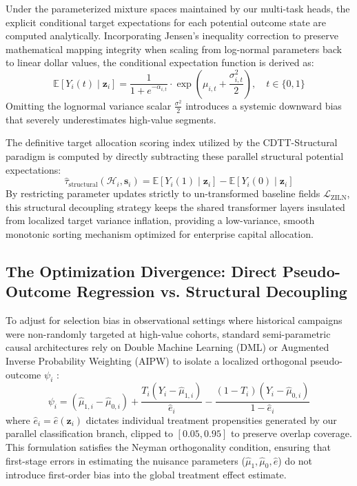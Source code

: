\documentclass[10pt, conference]{IEEEtran}
\newcommand{\ourmodel}{CDTT}
\begin{document}
Under the parameterized mixture spaces maintained by our multi-task heads, the explicit conditional target expectations for each potential outcome state are computed analytically. Incorporating Jensen's inequality correction to preserve mathematical mapping integrity when scaling from log-normal parameters back to linear dollar values, the conditional expectation function is derived as:
\begin{equation}
\mathbb{E}[Y_i(t) \mid \mathbf{z}_i] = \frac{1}{1 + e^{-\alpha_{i,t}}} \cdot \exp\left( \mu_{i,t} + \frac{\sigma_{i,t}^2}{2} \right), \quad t \in \{0, 1\}
\end{equation}
Omitting the lognormal variance scalar $\frac{\sigma^2}{2}$ introduces a systemic downward bias that severely underestimates high-value segments. 

The definitive target allocation scoring index utilized by the \ourmodel-Structural paradigm is computed by directly subtracting these parallel structural potential expectations:
\begin{equation}
\hat{\tau}_{\text{structural}}(\mathcal{H}_i, \mathbf{s}_i) = \mathbb{E}[Y_i(1) \mid \mathbf{z}_i] - \mathbb{E}[Y_i(0) \mid \mathbf{z}_i]
\end{equation}
By restricting parameter updates strictly to un-transformed baseline fields $\mathcal{L}_{\text{ZILN}}$, this structural decoupling strategy keeps the shared transformer layers insulated from localized target variance inflation, providing a low-variance, smooth monotonic sorting mechanism optimized for enterprise capital allocation.

\subsection{The Optimization Divergence: Direct Pseudo-Outcome Regression vs. Structural Decoupling}
To adjust for selection bias in observational settings where historical campaigns were non-randomly targeted at high-value cohorts, standard semi-parametric causal architectures rely on Double Machine Learning (DML) or Augmented Inverse Probability Weighting (AIPW) to isolate a localized orthogonal pseudo-outcome $\psi_i$ \cite{Chernozhukov2018, Kennedy2023}:
\begin{equation}
\psi_i = (\hat{\mu}_{1,i} - \hat{\mu}_{0,i}) + \frac{T_i(Y_i - \hat{\mu}_{1,i})}{\hat{e}_i} - \frac{(1-T_i)(Y_i - \hat{\mu}_{0,i})}{1 - \hat{e}_i}
\end{equation}
where $\hat{e}_i = \hat{e}(\mathbf{z}_i)$ dictates individual treatment propensities generated by our parallel classification branch, clipped to $[0.05, 0.95]$ to preserve overlap coverage. This formulation satisfies the Neyman orthogonality condition, ensuring that first-stage errors in estimating the nuisance parameters ($\hat{\mu}_1, \hat{\mu}_0, \hat{e}$) do not introduce first-order bias into the global treatment effect estimate.
\end{document}
